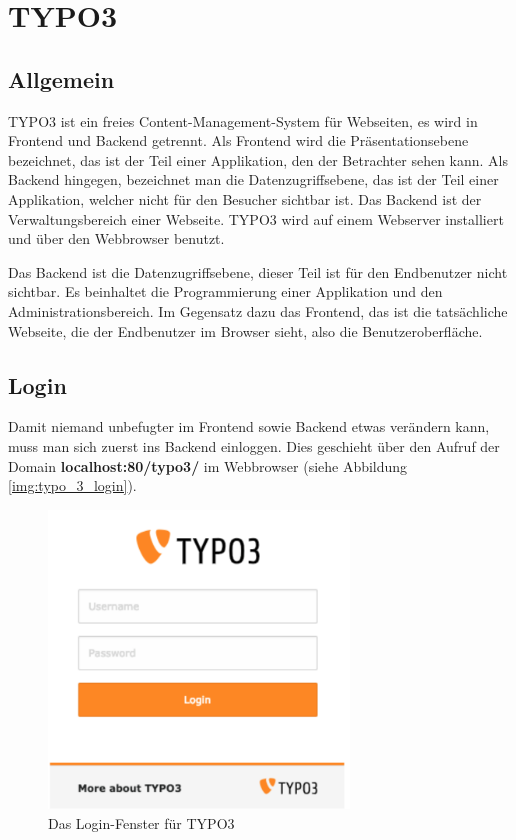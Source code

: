 \section{TYPO3}
\subsection{Allgemein}

TYPO3 ist ein freies Content-Management-System für Webseiten, es wird in Frontend und Backend getrennt. Als Frontend wird die Präsentationsebene bezeichnet, das ist der Teil einer Applikation, den der Betrachter sehen kann. Als Backend hingegen, bezeichnet man die Datenzugriffsebene, das ist der Teil einer Applikation, welcher nicht für den Besucher sichtbar ist. Das Backend ist der Verwaltungsbereich einer Webseite. TYPO3 wird auf einem Webserver installiert und über den Webbrowser benutzt.

Das Backend ist die Datenzugriffsebene, dieser Teil ist für den Endbenutzer nicht sichtbar. Es beinhaltet die Programmierung einer Applikation und den Administrationsbereich. Im Gegensatz dazu das Frontend, das ist die tatsächliche Webseite, die der Endbenutzer im Browser sieht, also die Benutzeroberfläche.

\subsection{Login}

Damit niemand unbefugter im Frontend sowie Backend etwas verändern kann, muss man sich zuerst ins Backend einloggen. Dies geschieht über den Aufruf der Domain \textbf{localhost:80/typo3/} im Webbrowser (siehe Abbildung \ref{img:typo_3_login}).

\begin{figure}[ht!]
\centering
\includegraphics[width=8cm]{Figures/paula/login_TYPO3.png}
\caption{Das Login-Fenster für TYPO3}
\label{img:typo_3_logIn}
\end{figure}

